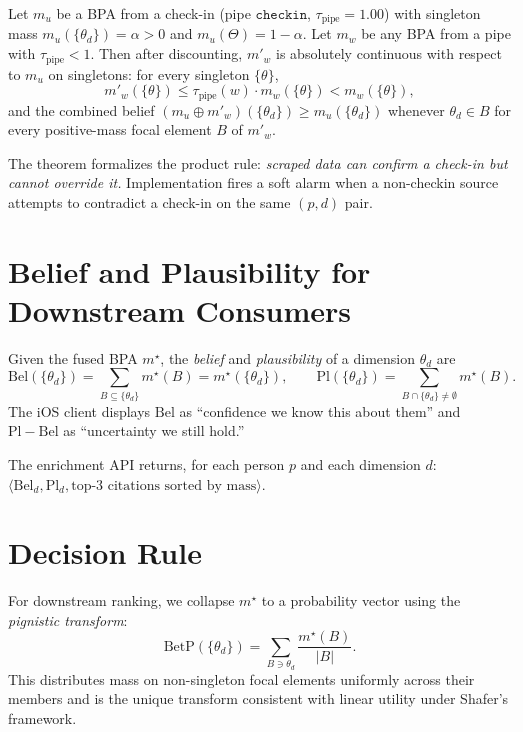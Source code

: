 \documentclass[11pt]{article}
\begin{document}
\begin{theorem}
Let $m_u$ be a BPA from a check-in (pipe $\texttt{checkin}$,
$\tau_{\text{pipe}}=1.00$) with singleton mass
$m_u(\{\theta_d\}) = \alpha > 0$ and $m_u(\Theta) = 1-\alpha$. Let
$m_w$ be any BPA from a pipe with $\tau_{\text{pipe}} < 1$. Then
after discounting, $m'_w$ is absolutely continuous with respect to
$m_u$ on singletons: for every singleton $\{\theta\}$,
\[
m'_w(\{\theta\}) \le \tau_{\text{pipe}}(w) \cdot m_w(\{\theta\}) < m_w(\{\theta\}),
\]
and the combined belief
$(m_u\oplus m'_w)(\{\theta_d\}) \ge m_u(\{\theta_d\})$
whenever $\theta_d \in B$ for every positive-mass focal element $B$ of
$m'_w$.
\end{theorem}

The theorem formalizes the product rule: \emph{scraped data can confirm
a check-in but cannot override it.} Implementation fires a soft alarm
when a non-checkin source attempts to contradict a check-in on the
same $(p, d)$ pair.

\section{Belief and Plausibility for Downstream Consumers}

Given the fused BPA $m^\star$, the \emph{belief} and
\emph{plausibility} of a dimension $\theta_d$ are
\[
\mathrm{Bel}(\{\theta_d\}) = \sum_{B \subseteq \{\theta_d\}} m^\star(B) = m^\star(\{\theta_d\}),
\qquad
\mathrm{Pl}(\{\theta_d\}) = \sum_{B \cap \{\theta_d\} \neq \emptyset} m^\star(B).
\]
The iOS client displays $\mathrm{Bel}$ as ``confidence we know this
about them'' and $\mathrm{Pl} - \mathrm{Bel}$ as ``uncertainty we
still hold.''

The enrichment API returns, for each person $p$ and each dimension
$d$:
$\langle \mathrm{Bel}_d, \mathrm{Pl}_d, \text{top-3 citations sorted by mass} \rangle$.

\section{Decision Rule}

For downstream ranking, we collapse $m^\star$ to a probability vector
using the \emph{pignistic transform}:
\[
\mathrm{BetP}(\{\theta_d\}) = \sum_{B \ni \theta_d} \frac{m^\star(B)}{|B|}.
\]
This distributes mass on non-singleton focal elements uniformly across
their members and is the unique transform consistent with linear
utility under Shafer's framework.
\end{document}

